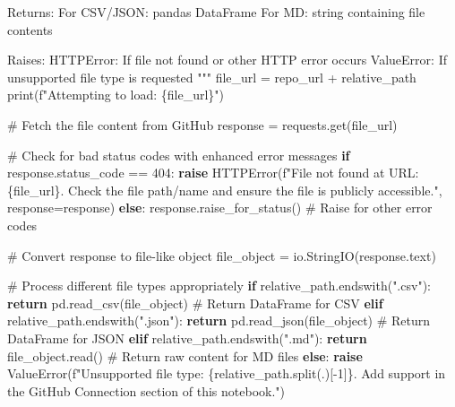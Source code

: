 \documentclass[
  11pt,
  letterpaper,
]{book}
\newenvironment{Shaded}{\begin{snugshade}}{\end{snugshade}}
\newcommand{\BuiltInTok}[1]{\textcolor[rgb]{0.00,0.23,0.31}{#1}}
\newcommand{\CommentTok}[1]{\textcolor[rgb]{0.37,0.37,0.37}{#1}}
\newcommand{\ControlFlowTok}[1]{\textcolor[rgb]{0.00,0.23,0.31}{\textbf{#1}}}
\newcommand{\DecValTok}[1]{\textcolor[rgb]{0.68,0.00,0.00}{#1}}
\newcommand{\NormalTok}[1]{\textcolor[rgb]{0.00,0.23,0.31}{#1}}
\newcommand{\OperatorTok}[1]{\textcolor[rgb]{0.37,0.37,0.37}{#1}}
\newcommand{\PreprocessorTok}[1]{\textcolor[rgb]{0.68,0.00,0.00}{#1}}
\newcommand{\SpecialCharTok}[1]{\textcolor[rgb]{0.37,0.37,0.37}{#1}}
\newcommand{\SpecialStringTok}[1]{\textcolor[rgb]{0.13,0.47,0.30}{#1}}
\newcommand{\StringTok}[1]{\textcolor[rgb]{0.13,0.47,0.30}{#1}}
\begin{document}
\begin{Shaded}
\begin{Highlighting}[]
\CommentTok{    Returns:}
\CommentTok{        For CSV/JSON: pandas DataFrame}
\CommentTok{        For MD: string containing file contents}

\CommentTok{    Raises:}
\CommentTok{        HTTPError: If file not found or other HTTP error occurs}
\CommentTok{        ValueError: If unsupported file type is requested}
\CommentTok{    """}
\NormalTok{    file\_url }\OperatorTok{=}\NormalTok{ repo\_url }\OperatorTok{+}\NormalTok{ relative\_path}
    \BuiltInTok{print}\NormalTok{(}\SpecialStringTok{f"Attempting to load: }\SpecialCharTok{\{}\NormalTok{file\_url}\SpecialCharTok{\}}\SpecialStringTok{"}\NormalTok{)}

    \CommentTok{\# Fetch the file content from GitHub}
\NormalTok{    response }\OperatorTok{=}\NormalTok{ requests.get(file\_url)}

    \CommentTok{\# Check for bad status codes with enhanced error messages}
    \ControlFlowTok{if}\NormalTok{ response.status\_code }\OperatorTok{==} \DecValTok{404}\NormalTok{:}
        \ControlFlowTok{raise}\NormalTok{ HTTPError(}\SpecialStringTok{f"File not found at URL: }\SpecialCharTok{\{}\NormalTok{file\_url}\SpecialCharTok{\}}\SpecialStringTok{. Check the file path/name and ensure the file is publicly accessible."}\NormalTok{, response}\OperatorTok{=}\NormalTok{response)}
    \ControlFlowTok{else}\NormalTok{:}
\NormalTok{        response.raise\_for\_status()  }\CommentTok{\# Raise for other error codes}

    \CommentTok{\# Convert response to file{-}like object}
\NormalTok{    file\_object }\OperatorTok{=}\NormalTok{ io.StringIO(response.text)}

    \CommentTok{\# Process different file types appropriately}
    \ControlFlowTok{if}\NormalTok{ relative\_path.endswith(}\StringTok{".csv"}\NormalTok{):}
        \ControlFlowTok{return}\NormalTok{ pd.read\_csv(file\_object)  }\CommentTok{\# Return DataFrame for CSV}
    \ControlFlowTok{elif}\NormalTok{ relative\_path.endswith(}\StringTok{".json"}\NormalTok{):}
        \ControlFlowTok{return}\NormalTok{ pd.read\_json(file\_object)  }\CommentTok{\# Return DataFrame for JSON}
    \ControlFlowTok{elif}\NormalTok{ relative\_path.endswith(}\StringTok{".md"}\NormalTok{):}
        \ControlFlowTok{return}\NormalTok{ file\_object.read()  }\CommentTok{\# Return raw content for MD files}
    \ControlFlowTok{else}\NormalTok{:}
        \ControlFlowTok{raise} \PreprocessorTok{ValueError}\NormalTok{(}\SpecialStringTok{f"Unsupported file type: }\SpecialCharTok{\{}\NormalTok{relative\_path}\SpecialCharTok{.}\NormalTok{split(}\StringTok{\textquotesingle{}.\textquotesingle{}}\NormalTok{)[}\OperatorTok{{-}}\DecValTok{1}\NormalTok{]}\SpecialCharTok{\}}\SpecialStringTok{. Add support in the GitHub Connection section of this notebook."}\NormalTok{)}


\end{Highlighting}
\end{Shaded}
\end{document}
